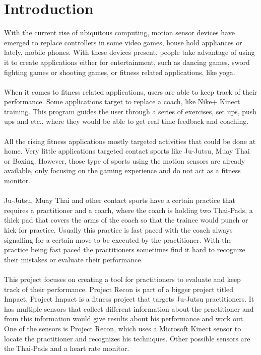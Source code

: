 \chapter{Introduction}
\label{chap:intro}
With the current rise of ubiquitous computing, motion sensor devices have emerged to replace controllers in some video games, house hold appliances or lately, mobile phones. With these devices present, people take advantage of using it to create applications either for entertainment, such as dancing games, sword fighting games or shooting games, or fitness related applications, like yoga.  
\\
\\
When it comes to fitness related applications, users are able to keep track of their performance. Some applications target to replace a coach, like Nike+ Kinect training. This program guides the user through a series of exercises, set ups, push ups and etc., where they would be able to get real time feedback and coaching.
\\
\\
All the rising fitness applications mostly targeted activities that could be done at home. Very little applications targeted contact sports like Ju-Jutsu, Muay Thai or Boxing. However, those type of sports using the motion sensors are already available, only focusing on the gaming experience and do not act as a fitness monitor.
\\
\\
Ju-Jutsu, Muay Thai and other contact sports have a certain practice that requires a practitioner and a coach, where the coach is holding two Thai-Pads, a thick pad that covers the arms of the coach so that the trainee would punch or kick for practice. Usually this practice is fast paced with the coach always signalling for a certain move to be executed by the practitioner. With the practice being fast paced the practitioners sometimes find it hard to recognize their mistakes or evaluate their performance.
\\
\\  
This project focuses on creating a tool for practitioners to evaluate and keep track of their performance. Project Recon is part of a bigger project titled Impact. Project Impact is a fitness project that targets Ju-Jutsu practitioners. It has multiple sensors that collect different information about the practitioner and from this information would give results about his performance and work out. One of the sensors is Project Recon, which uses a Microsoft Kinect sensor to locate the practitioner and recognizes his techniques. Other possible sensors are the Thai-Pads and a heart rate monitor.


